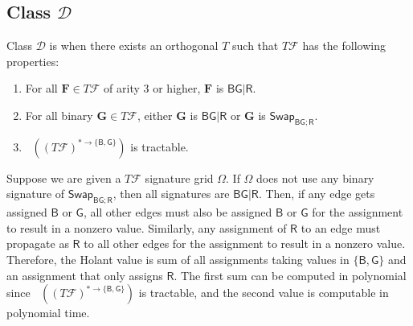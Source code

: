 \documentclass[11pt]{article}
\DeclareMathOperator{\holbs}{Holant^*_2}
\newcommand{\db}{\mathsf{B}}
\newcommand{\dg}{\mathsf{G}}
\newcommand{\dr}{\mathsf{R}}
\newcommand{\swhelper}[1]{$\mathsf{Swap}_{#1}$\xspace}
\newcommand{\swbg}{\swhelper{\db \dg; \dr}}
\newcommand{\domres}[1]{
  ^{*\to\{#1\}}
}
\newcommand{\tractBGR}{$\mathscr{D}$\xspace}
\begin{document}
\subsection{Class \texorpdfstring{\tractBGR}{D}}
Class \tractBGR is when there exists an orthogonal $T$ such that $T \mathcal{F}$ has the following properties:
\begin{enumerate}
        \item For all $\mathbf{F} \in T \mathcal{F}$ of arity $3$ or higher, $\mathbf{F}$ is $\db \dg | \dr$.
        \item For all binary $\mathbf{G} \in T \mathcal{F}$, either $\mathbf{G}$ is $\db \dg | \dr$ or $\mathbf{G}$ is \swbg.
\item $\holbs((T\mathcal{F})\domres{\db, \dg})$ is tractable.
      \end{enumerate}
Suppose we are given a $T \mathcal{F}$ signature grid $\Omega$.
If $\Omega$ does not use any binary signature of \swbg, then all signatures are $\db \dg | \dr$. 
Then, if any edge gets assigned $\db$ or $\dg$, all other edges must also be assigned $\db$ or $\dg$ for the assignment to result in a nonzero value.
Similarly, any assignment of $\dr$ to an edge must propagate as $\dr$ to all other edges for the assignment to result in a nonzero value.
Therefore, the Holant value is sum of all assignments taking values in $\{\db, \dg\}$ and an assignment that only assigns $\dr$.
The first sum can be computed in polynomial since $\holbs( (T\mathcal{F})\domres{\db, \dg})$ is tractable, and the second value is computable in polynomial time.
\end{document}
